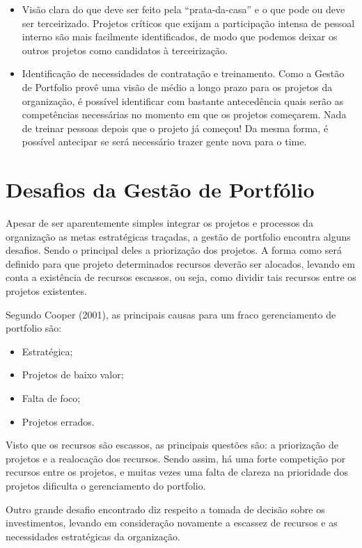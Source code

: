 \documentclass[12pt,a4paper,ruledheader,tocpage=prefix,floatnumber=continuous,pagestart=folhaderosto,font=times]{abnt}
\begin{document}
\begin{itemize}
 \item Visão clara do que deve ser feito pela “prata-da-casa” e o que pode ou deve ser terceirizado. Projetos críticos que exijam a participação intensa de pessoal interno são mais facilmente identificados, de modo que podemos deixar os outros projetos como candidatos à terceirização.
 \item Identificação de necessidades de contratação e treinamento. Como a Gestão de Portfolio provê uma visão de médio a longo prazo para os projetos da organização, é possível identificar com bastante antecedência quais serão as competências necessárias no momento em que os projetos 
começarem. Nada de treinar pessoas depois que o projeto já começou! Da mesma forma, é possível antecipar se será necessário trazer gente nova para o time.
\end{itemize}

\section{Desafios da Gestão de Portfólio}
Apesar de ser aparentemente simples integrar os projetos e processos da organização as metas estratégicas traçadas, a gestão de portfolio encontra alguns 
desafios. Sendo o principal deles a priorização dos projetos. A forma como será definido para que projeto determinados recursos deverão ser alocados, 
levando em conta a existência de recursos escassos, ou seja, como dividir tais recursos entre os projetos existentes.

Segundo Cooper (2001), as principais causas para um fraco gerenciamento de portfolio são:
\begin{itemize}
 \item Estratégica;
 \item Projetos de baixo valor;
 \item Falta de foco;
 \item Projetos errados.
\end{itemize}

Visto que os recursos são escassos, as principais questões são: a priorização de projetos e a realocação dos recursos. Sendo assim, há uma forte competição 
por recursos entre os projetos, e muitas vezes uma falta de clareza na prioridade dos projetos dificulta o gerenciamento do portfolio.

Outro grande desafio encontrado diz respeito a tomada de decisão sobre os investimentos, levando em consideração novamente a escassez de recursos e as 
necessidades estratégicas da organização. 
\end{document}
